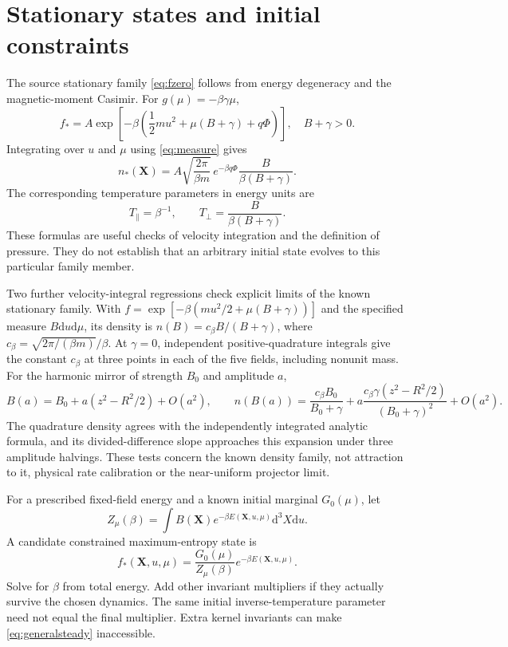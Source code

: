 \documentclass[11pt,letterpaper]{article}
\newcommand{\dd}{\mathrm d}
\newcommand{\X}{\mathbf X}
\begin{document}
\section{Stationary states and initial constraints}

The source stationary family \eqref{eq:fzero} follows from energy degeneracy and
the magnetic-moment Casimir. For $g(\mu)=-\beta\gamma\mu$,
\begin{equation}
 f_*=A\exp\left[-\beta\left(\frac12m u^2+
 \mu(B+\gamma)+q\Phi\right)\right],\quad B+\gamma>0.
 \label{eq:linearg}
\end{equation}
Integrating over $u$ and $\mu$ using \eqref{eq:measure} gives
\begin{equation}
 n_*(\X)=A\sqrt{\frac{2\pi}{\beta m}}\,
 e^{-\beta q\Phi}\frac{B}{\beta(B+\gamma)}.
 \label{eq:density}
\end{equation}
The corresponding temperature parameters in energy units are
\begin{equation}
 T_\parallel=\beta^{-1},\qquad
 T_\perp=\frac{B}{\beta(B+\gamma)}.
 \label{eq:temperatures}
\end{equation}
These formulas are useful checks of velocity integration and the definition of
pressure. They do not establish that an arbitrary initial state evolves to this
particular family member.

Two further velocity-integral regressions check explicit limits of the known
stationary family. With $f=\exp[-\beta(m u^2/2+\mu(B+\gamma))]$ and the
specified measure $B\dd u\dd\mu$, its density is
$n(B)=c_\beta B/(B+\gamma)$, where
$c_\beta=\sqrt{2\pi/(\beta m)}/\beta$. At $\gamma=0$, independent
positive-quadrature integrals give the constant $c_\beta$ at three points in
each of the five fields, including nonunit mass. For the harmonic mirror
of strength $B_0$ and amplitude $a$,
\[
 B(a)=B_0+a(z^2-R^2/2)+O(a^2),\qquad
 n(B(a))=\frac{c_\beta B_0}{B_0+\gamma}
 +a\frac{c_\beta\gamma(z^2-R^2/2)}{(B_0+\gamma)^2}+O(a^2).
\]
The quadrature density agrees with the independently integrated analytic
formula, and its divided-difference slope approaches this expansion under
three amplitude halvings. These tests concern the known density family,
not attraction to it, physical rate calibration or the near-uniform
projector limit.

For a prescribed fixed-field energy and a known initial marginal $G_0(\mu)$,
let
\begin{equation}
 Z_\mu(\beta)=\int B(\X)e^{-\beta E(\X,u,\mu)}\dd^3X\dd u.
\end{equation}
A candidate constrained maximum-entropy state is
\begin{equation}
 f_*(\X,u,\mu)=\frac{G_0(\mu)}{Z_\mu(\beta)}e^{-\beta E(\X,u,\mu)}.
 \label{eq:generalsteady}
\end{equation}
Solve for $\beta$ from total energy. Add other invariant multipliers if they
actually survive the chosen dynamics. The same initial inverse-temperature
parameter need not equal the final multiplier. Extra kernel invariants can make
\eqref{eq:generalsteady} inaccessible.
\end{document}
